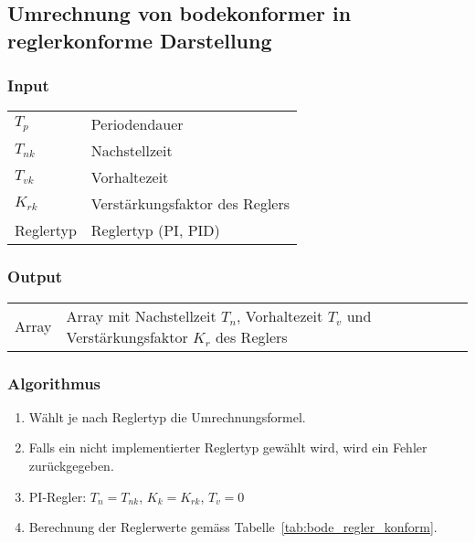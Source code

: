 \clearpage
\subsection{Umrechnung von bodekonformer in reglerkonforme Darstellung}
\label{app:algo:boderegler}

\subsubsection*{Input}

\begin{tabular}{p{40mm}l}
    $ T_p  $ & Periodendauer \\
    $ T_{nk} $ & Nachstellzeit \\
    $ T_{vk} $ & Vorhaltezeit \\
    $ K_{rk} $ & Verst\"arkungsfaktor des Reglers \\
      Reglertyp   & Reglertyp (PI, PID)
\end{tabular}

\subsubsection*{Output}
\begin{tabular}{p{40mm}l}
    Array & \parbox[t][4em][s]{0.7\textwidth}{Array mit Nachstellzeit $T_n$, Vorhaltezeit $T_v$ und Verst\"arkungsfaktor $K_r$ des Reglers}
\end{tabular}

\subsubsection*{Algorithmus}
\begin{enumerate}
    \item
        W\"ahlt je nach Reglertyp die Umrechnungsformel.
    \item
        Falls  ein nicht  implementierter Reglertyp  gew\"ahlt wird,  wird ein
        Fehler zur\"uckgegeben.
    \item
        PI-Regler:
        $T_{n} = T_{nk}$, $K_{k} = K_{rk}$, $T_{v} = 0$
    \item
        Berechnung             der            Reglerwerte             gem\"ass
        Tabelle~\ref{tab:bode_regler_konform}.
\end{enumerate}

